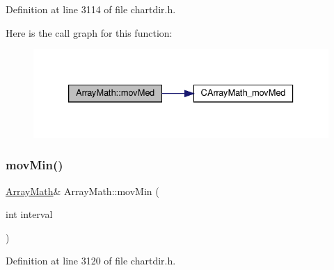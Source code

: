 Definition at line 3114 of file chartdir.\+h.

Here is the call graph for this function\+:
\nopagebreak
\begin{figure}[H]
\begin{center}
\leavevmode
\includegraphics[width=333pt]{class_array_math_a7f994291fd85c2859e7bf34c27b8013e_cgraph}
\end{center}
\end{figure}
\mbox{\label{class_array_math_a42df280f64eaaad8150985d962516276}} 
\subsubsection{\texorpdfstring{mov\+Min()}{movMin()}}
{\footnotesize\ttfamily \hyperlink{class_array_math}{Array\+Math}\& Array\+Math\+::mov\+Min (\begin{DoxyParamCaption}\item[{int}]{interval }\end{DoxyParamCaption})\hspace{0.3cm}{\ttfamily [inline]}}



Definition at line 3120 of file chartdir.\+h.

